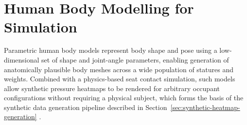 \section{Human Body Modelling for Simulation}
\label{sec:human-body-modelling}
Parametric human body models represent body shape and pose using a
low-dimensional set of shape and joint-angle parameters, enabling
generation of anatomically plausible body meshes across a wide population
of statures and weights. Combined with a physics-based seat contact
simulation, such models allow synthetic pressure heatmaps to be rendered
for arbitrary occupant configurations without requiring a physical
subject, which forms the basis of the synthetic data generation pipeline
described in Section~\ref{sec:synthetic-heatmap-generation}
\cite{ivanov2021synthetic}.
